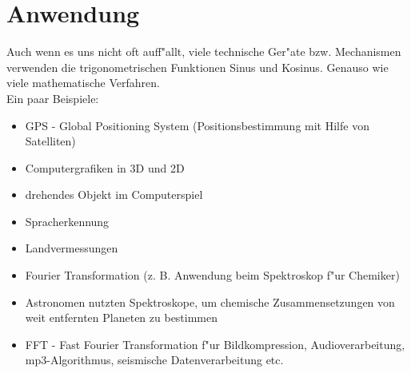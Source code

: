 \documentclass{standalone}
\begin{document}
\section{Anwendung}
Auch wenn es uns nicht oft auff{"a}llt, viele technische Ger{"a}te bzw. Mechanismen verwenden die trigonometrischen Funktionen Sinus und Kosinus. Genauso wie viele mathematische Verfahren.\\
\noindent Ein paar Beispiele:

\vspace{-\topsep}
\begin{itemize}
  \setlength{\parskip}{0pt}
  \setlength{\itemsep}{0pt plus 1pt}
  \item GPS - Global Positioning System (Positionsbestimmung mit Hilfe von Satelliten)
  \item Computergrafiken in 3D und 2D
  \item drehendes Objekt im Computerspiel
  \item Spracherkennung
  \item Landvermessungen
  \item Fourier Transformation (z. B. Anwendung beim Spektroskop f{"u}r Chemiker)
  \item Astronomen nutzten Spektroskope, um chemische Zusammensetzungen von weit entfernten Planeten zu bestimmen
  \item FFT - Fast Fourier Transformation f{"u}r Bildkompression, Audioverarbeitung, mp3-Algorithmus, seismische Datenverarbeitung etc.
\end{itemize}
\vspace{-\topsep}
\end{document}
